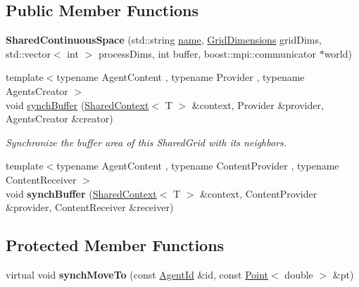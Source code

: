 \subsection*{Public Member Functions}
\begin{DoxyCompactItemize}
\item 
\hypertarget{classrepast_1_1_shared_continuous_space_a4ef3b8e7673c6bb967b9aa4ea90bf902}{{\bfseries Shared\-Continuous\-Space} (std\-::string \hyperlink{classrepast_1_1_projection_ab60a0ab4f584685780307d7431b61800}{name}, \hyperlink{classrepast_1_1_grid_dimensions}{Grid\-Dimensions} grid\-Dims, std\-::vector$<$ int $>$ process\-Dims, int buffer, boost\-::mpi\-::communicator $\ast$world)}\label{classrepast_1_1_shared_continuous_space_a4ef3b8e7673c6bb967b9aa4ea90bf902}

\item 
{\footnotesize template$<$typename Agent\-Content , typename Provider , typename Agents\-Creator $>$ }\\void \hyperlink{classrepast_1_1_shared_continuous_space_aadc5ded18049649d752ac9ab267566dc}{synch\-Buffer} (\hyperlink{classrepast_1_1_shared_context}{Shared\-Context}$<$ T $>$ \&context, Provider \&provider, Agents\-Creator \&creator)
\begin{DoxyCompactList}\small\item\em Synchronize the buffer area of this Shared\-Grid with its neighbors. \end{DoxyCompactList}\item 
\hypertarget{classrepast_1_1_shared_continuous_space_a843f532b2e1c305c8b95591380b8ccfa}{{\footnotesize template$<$typename Agent\-Content , typename Content\-Provider , typename Content\-Receiver $>$ }\\void {\bfseries synch\-Buffer} (\hyperlink{classrepast_1_1_shared_context}{Shared\-Context}$<$ T $>$ \&context, Content\-Provider \&provider, Content\-Receiver \&receiver)}\label{classrepast_1_1_shared_continuous_space_a843f532b2e1c305c8b95591380b8ccfa}

\end{DoxyCompactItemize}
\subsection*{Protected Member Functions}
\begin{DoxyCompactItemize}
\item 
\hypertarget{classrepast_1_1_shared_continuous_space_afcec67affcb216e1d1e0d558acfc3557}{virtual void {\bfseries synch\-Move\-To} (const \hyperlink{classrepast_1_1_agent_id}{Agent\-Id} \&id, const \hyperlink{classrepast_1_1_point}{Point}$<$ double $>$ \&pt)}\label{classrepast_1_1_shared_continuous_space_afcec67affcb216e1d1e0d558acfc3557}

\end{DoxyCompactItemize}


